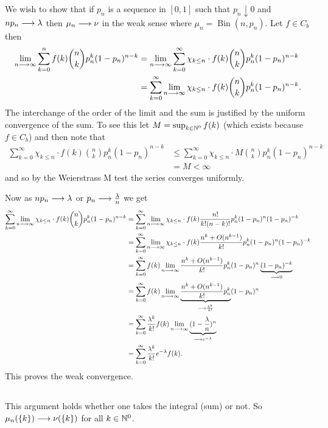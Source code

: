 \documentclass{unswmaths}
\begin{document}
We wish to show that if $ p_n $ is a sequence in $ [0,1] $ such that $ p_n \downarrow 0 $ and $ np_n \longrightarrow \lambda $ then $ \mu_n \longrightarrow \nu $ in the weak sense where $ \mu_n = \operatorname{Bin}(n, p_n) $.
Let $ f \in C_b $ then
\begin{align}
	\lim_{n\longrightarrow \infty} \sum_{k=0}^{n} f(k) {n\choose k} p_n^k(1-p_n)^{n-k}
		&= \lim_{n\longrightarrow \infty} \sum_{k=0}^\infty \chi_{k \leq n} \cdot f(k) {n\choose k} p_n^k(1-p_n)^{n-k} \\
		&= \sum_{k=0}^\infty \lim_{n\longrightarrow \infty} \chi_{k \leq n} \cdot f(k) {n\choose k} p_n^k(1-p_n)^{n-k}.
\end{align}
The interchange of the order of the limit and the sum is justified by the uniform convergence of the sum. To see this let $ M = \sup_{k \in \mathbb{N}^0} f(k) $ (which exists because $ f \in C_b $) and then note that 
\begin{align}
	\sum_{k=0}^\infty \chi_{k \leq n} \cdot f(k) {n\choose k} p_n^k(1-p_n)^{n-k} &\leq \sum_{k=0}^\infty \chi_{k \leq n} \cdot M {n\choose k} p_n^k(1-p_n)^{n-k} \\
	&= M < \infty
\end{align}
and so by the Weierstrass M test the series converges uniformly. 

Now as $ np_n \longrightarrow \lambda $ or $ p_n \longrightarrow \frac{\lambda}{n} $ we get
\begin{align}
	\sum_{k=0}^\infty \lim_{n\longrightarrow \infty} \chi_{k \leq n} \cdot f(k) {n\choose k} p_n^k(1-p_n)^{n-k} &= \sum_{k=0}^\infty \lim_{n\longrightarrow \infty} \chi_{k \leq n} \cdot f(k) \frac{n!}{k!(n-k)!} p_n^k(1-p_n)^{n} (1-p_n)^{-k} \\
	&= \sum_{k=0}^\infty \lim_{n\longrightarrow \infty} \chi_{k \leq n} \cdot f(k) \frac{n^k + O(n^{k-1})}{k!} p_n^k(1-p_n)^{n} (1-p_n)^{-k} \\
	&= \sum_{k=0}^\infty  f(k)\lim_{n\longrightarrow \infty} \frac{n^k + O(n^{k-1})}{k!} p_n^k(1-p_n)^{n} \underbrace{(1-p_n)^{-k}}_{\longrightarrow 0} \\
	&= \sum_{k=0}^\infty  f(k)\lim_{n\longrightarrow \infty} \underbrace{\frac{n^k + O(n^{k-1})}{k!} p_n^k}_{\longrightarrow \frac{\lambda^k}{k!}}(1-p_n)^{n} \\
	&= \sum_{k=0}^\infty \frac{\lambda^k}{k!} f(k)\lim_{n\longrightarrow \infty} \underbrace{(1-\frac{\lambda}{n})^{n}}_{\longrightarrow e^{-\lambda}} \\
	&= \sum_{k=0}^\infty \frac{\lambda^k}{k!} e^{-\lambda} f(k).
\end{align}
This proves the weak convergence.
\subsection{}
This argument holds whether one takes the integral (sum) or not. So $ \mu_n(\{k\}) \longrightarrow \nu(\{k\}) $ for all $ k \in \mathbb{N}^0$.
\end{document}
